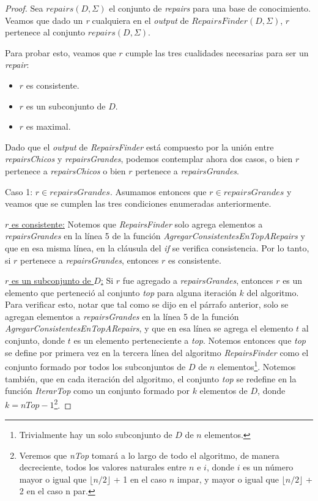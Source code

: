\documentclass[11pt,a4paper,twoside]{tesis}
\begin{document}
\begin{proof}
Sea $repairs(D, \Sigma)$ el conjunto de \textit{repairs} para una base de conocimiento. Veamos que dado un \textit{r} cualquiera en el \textit{output} de $RepairsFinder(D, \Sigma)$, $r$ pertenece al conjunto $repairs(D, \Sigma)$.

Para probar esto, veamos que $r$ cumple las tres cualidades necesarias para ser un \textit{repair}:

\begin{itemize}
    \item $r$ es consistente.
    \item $r$ es un subconjunto de $D$.
    \item $r$ es maximal. 
\end{itemize}

Dado que el \textit{output} de \textit{RepairsFinder} está compuesto por la unión entre \textit{repairsChicos} y \textit{repairsGrandes}, podemos contemplar ahora dos casos, o bien $r$ pertenece a \textit{repairsChicos} o bien $r$ pertenece a \textit{repairsGrandes}.

Caso 1: $r \in repairsGrandes$. Asumamos entonces que $r \in repairsGrandes$ y veamos que se cumplen las tres condiciones enumeradas anteriormente.

\underline{$r$ es consistente:} Notemos que \textit{RepairsFinder} solo agrega elementos a \textit{repairsGrandes} en la línea 5 de la función \textit{AgregarConsistentesEnTopARepairs} y que en esa misma línea, en la cláusula del \textit{if} se verifica consistencia. Por lo tanto,  si $r$ pertenece a \textit{repairsGrandes}, entonces $r$ es consistente.

\underline{$r$ es un subconjunto de $D$:} Si $r$ fue agregado a \textit{repairsGrandes}, entonces $r$ es un elemento que perteneció al conjunto \textit{top} para alguna iteración $k$ del algoritmo. Para verificar esto, notar que tal como se dijo en el párrafo anterior, solo se agregan elementos a \textit{repairsGrandes} en la línea 5 de la función \textit{AgregarConsistentesEnTopARepairs}, y que en esa línea se agrega el elemento $t$ al conjunto, donde $t$ es un elemento perteneciente a \textit{top}. Notemos entonces que \textit{top} se define por primera vez en la tercera línea del algoritmo \textit{RepairsFinder} como el conjunto formado por todos los subconjuntos de $D$ de $n$ elementos\footnote{Trivialmente hay un solo subconjunto de $D$ de $n$ elementos.}. Notemos también, que en cada iteración del algoritmo, el conjunto \textit{top} se redefine en la función \textit{IterarTop} como un conjunto formado por $k$ elementos de $D$, donde $k = nTop - 1$\footnote{Veremos que \textit{nTop} tomará a lo largo de todo el algoritmo, de manera decreciente, todos los valores naturales entre $n$ e $i$, donde $i$ es un número mayor o igual que $\lfloor n/2 \rfloor$ + 1 en el caso $n$ impar, y mayor o igual que  $\lfloor n/2 \rfloor$ + 2 en el caso n par.}.


\end{proof}
\end{document}
